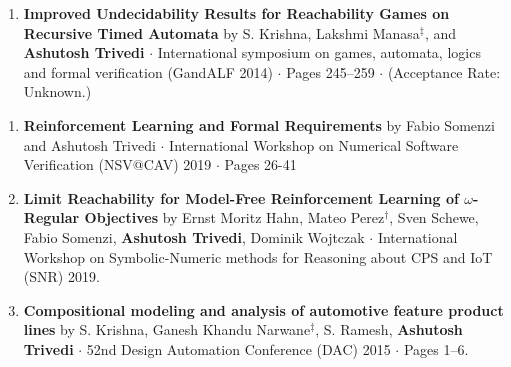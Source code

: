 \documentclass{article}
\begin{document}
\begin{enumerate}
\item
{\bf Improved Undecidability Results for Reachability Games on Recursive Timed
  Automata} by S. Krishna, Lakshmi Manasa${}^{\ddag}$, and {\bf Ashutosh Trivedi} $\cdot$ 
International symposium on games, automata, logics and
  formal verification (GandALF 2014) $\cdot$ Pages 245--259 $\cdot$ (Acceptance
  Rate: Unknown.)
\end{enumerate}


\vspace{1em}
\begin{enumerate}
  \item
  {\bf Reinforcement Learning and Formal Requirements} by Fabio Somenzi and
  Ashutosh Trivedi $\cdot$ International Workshop on Numerical Software
  Verification  (NSV@CAV) 2019 $\cdot$ Pages 26-41 
\item
{\bf  Limit Reachability for Model-Free Reinforcement Learning of
  $\omega$-Regular Objectives} by
  Ernst Moritz Hahn, Mateo Perez${}^{\dag}$, Sven Schewe, Fabio Somenzi, {\bf Ashutosh
  Trivedi}, Dominik Wojtczak $\cdot$ International
Workshop on Symbolic-Numeric methods for Reasoning about CPS and IoT (SNR) 2019.
\item 
{\bf Compositional modeling and analysis of automotive feature product lines}
by S. Krishna, Ganesh Khandu Narwane${}^{\ddag}$, S. Ramesh, {\bf Ashutosh Trivedi} $\cdot$ 52nd
Design Automation Conference (DAC) 2015 $\cdot$ Pages 1--6.
\end{enumerate}

\end{document}
